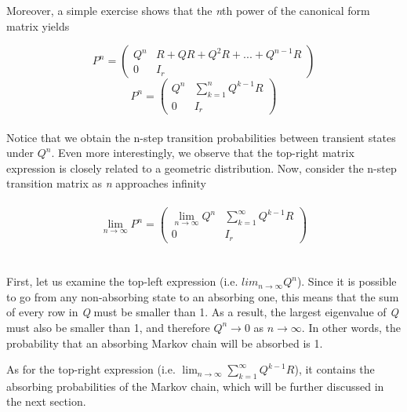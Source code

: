 \documentclass[a4paper, 12pt]{article}
\begin{document}
Moreover, a simple exercise shows that the \textit{n}th power of the canonical form matrix yields

	 \[
    P^n = \left(
    \begin{array}{c|c}
      Q^n & R + QR + Q^2R + ... + Q^{n-1}R\\
      \hline
      0 & I_r
    \end{array}
    \right)
  \]
  	 \[
    P^n = \left(
    \begin{array}{c|c}
      Q^n & \sum_{k=1}^{n}Q^{k-1}R\\
      \hline
      0 & I_r
    \end{array}
    \right)
  \]
\\
Notice that we obtain the n-step transition probabilities between transient states under $Q^n$. Even more interestingly, we observe that the top-right matrix expression is closely related to a geometric distribution.
Now, consider the n-step transition matrix as \textit{n} approaches infinity
\\
\\
  	 \[
    \lim_{n\to\infty}P^n = \left(
    \begin{array}{c|c}
      \lim_{n\to\infty} Q^n & \sum_{k=1}^{\infty}Q^{k-1}R\\
      \hline
      0 & I_r
    \end{array}
    \right)
  \]
\\
\\
First, let us examine the top-left expression (i.e. $lim_{n\to\infty}Q^n$). Since it is possible to go from any non-absorbing state to an absorbing one, this means that the sum of every row in \textit{Q} must be smaller than 1. As a result, the largest eigenvalue of \textit{Q} must also be smaller than 1, and therefore $Q^n \rightarrow 0$ as $n \rightarrow \infty$. In other words, the probability that an absorbing Markov chain will be absorbed is 1.


As for the top-right expression (i.e. $\lim_{n\to\infty} \sum_{k=1}^{\infty}Q^{k-1}R$), it contains the absorbing probabilities of the Markov chain, which will be further discussed in the next section.
\end{document}
